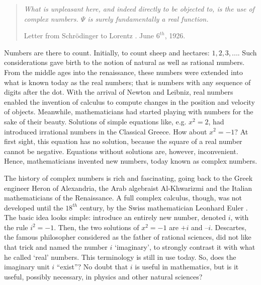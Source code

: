 \documentclass[onecolumn,prx,amsmath,amssymb,12pt]{revtex4-2}
\begin{document}
\begin{quote}
\emph{What is unpleasant here, and indeed directly to be objected to, is the use of complex numbers. $\Psi$ is surely fundamentally a real function.}

Letter from Schr\"{o}dinger to Lorentz \cite{einstein2011letters}. June $6^{th}$, 1926.    
\end{quote}

\newpage

Numbers are there to count. Initially, to count sheep and hectares: $1,2,3,...$. Such considerations gave birth to the notion of natural as well as rational numbers. From the middle ages into the renaissance, these numbers were extended into what is known today as the real numbers; that is numbers with any sequence of digits after the dot. With the arrival of Newton and Leibniz, real numbers enabled the invention of calculus to compute changes in the position and velocity of objects. Meanwhile, mathematicians had started playing with numbers for the sake of their beauty. Solutions of simple equations like, e.g. $x^2=2$, had introduced irrational numbers in the Classical Greece. How about $x^2=-1$? At first sight, this equation has no solution, because the square of a real number cannot be negative. Equations without solutions are, however, inconvenient. Hence, mathematicians invented new numbers, today known as complex numbers.

The history of complex numbers is rich and fascinating, going back to the Greek engineer Heron of Alexandria, the Arab algebraist Al-Khwarizmi and the Italian mathematicians of the Renaissance. A full complex calculus, though, was not developed until the $18^{th}$ century, by the Swiss mathematician Leonhard Euler \cite{complex_numbers}. The basic idea looks simple: introduce an entirely new number, denoted $i$, with the rule $i^2=-1$. Then, the two solutions of $x^2=-1$ are $+i$ and $–i$. Descartes, the famous philosopher considered as the father of rational sciences, did not like that trick and named the number $i$ `imaginary', to strongly contrast it with what he called `real' numbers. This terminology is still in use today. 
So, does the imaginary unit $i$ ``exist''? No doubt that $i$ is useful in mathematics, but is it useful, possibly necessary, in physics and other natural sciences?
\end{document}
